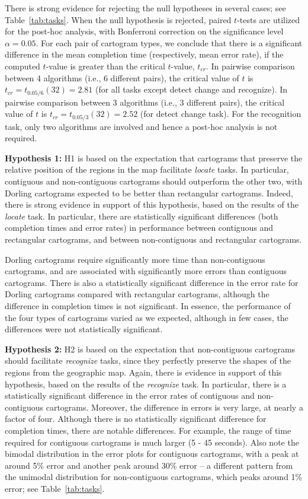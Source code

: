 \documentclass[10pt,journal,compsoc]{IEEEtran}
\begin{document}
 There is strong evidence for rejecting the null hypotheses in several cases; see Table~\ref{tab:tasks}. When the null hypothesis is rejected, paired $t$-tests are utilized for the post-hoc analysis, with Bonferroni correction on the significance level $\alpha = 0.05$. For each pair of cartogram types, we conclude that there is a significant difference in the mean completion time (respectively, mean error rate), if the computed $t$-value is greater than the critical $t$-value, $t_{cr}$.
 In pairwise comparison between 4 algorithms (i.e., 6 different pairs), the critical value of $t$ is $t_{cr}=t_{0.05/6}(32)=2.81$ (for all tasks except detect change and recognize). In pairwise comparison between 3 algorithms (i.e., 3 different pairs), the critical value of $t$ is $t_{cr}=t_{0.05/3}(32)=2.52$ (for detect change task). For the recognition task, only two algorithms are involved and hence a post-hoc analysis is not required. 


\medskip
\noindent
\textbf{Hypothesis 1:}
H1 is based on the expectation that cartograms that preserve the relative position of the regions in the map facilitate \textit{locate} tasks. In particular, contiguous and non-contiguous cartograms should outperform the other two, with Dorling cartograms expected to be better than rectangular cartograms.
Indeed, there is strong evidence in support of this hypothesis, based on the results of the \textit{locate} task.
In particular, there are statistically significant differences (both completion times and error rates)
in performance between contiguous and rectangular cartograms, and between non-contiguous and rectangular cartograms. 

Dorling cartograms require significantly more time than non-contiguous cartograms, and are associated with significantly more errors than contiguous cartograms.
 There is also a statistically significant difference in the error rate for Dorling cartograms compared with rectangular cartograms, although the difference in completion times is not significant. In essence, the performance of the four types of cartograms varied as we expected, although in few cases, the differences were not statistically significant. 



\medskip
\noindent
\textbf{Hypothesis 2:}
H2 is based on the expectation that non-contiguous cartograms should facilitate \textit{recognize} tasks, since they perfectly preserve the shapes of the regions from the geographic map.
Again, there is evidence in support of this hypothesis, based on the results of the \textit{recognize} task. In particular, 
there is a statistically significant difference in the error rates of contiguous and non-contiguous cartograms.
Moreover, the difference in errors is very large, at nearly a factor of four. 
Although there is no statistically significant difference for completion times, there are notable differences. For example, the range of time required for contiguous cartograms is much larger (5 - 45 seconds). Also note the bimodal distribution in the error plots for contiguous cartograms, with a peak at around 5\% error and another peak around 30\% error -- a different pattern from the unimodal distribution for non-contiguous cartograms, which peaks around 1\% error; see Table~\ref{tab:tasks}. 
\end{document}
